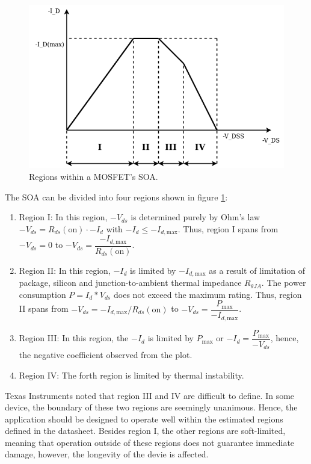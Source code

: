 \documentclass[main.tex]{subfiles}
\begin{document}
    \pagebreak
    \begin{figure}[!h]
        \centerline{\includegraphics[scale=0.5]{media/SOA_regions.drawio.png}}
        \caption{Regions within a MOSFET's SOA.}
        \label{fig:SOA_regions}
    \end{figure}

    \justify
    The SOA can be divided into four regions shown in figure \ref{fig:SOA_regions}:
    \begin{enumerate}
        \item Region I: In this region, $-V_{ds}$ is determined purely by Ohm's law  $-V_{ds} = R_{ds}(\text{on})\cdot -I_d$ with $-I_d \leq -I_{d,\text{max}}$. Thus, region I spans from $-V_{ds} = 0$ to $-V_{ds} = \dfrac{-I_{d,\text{max}}}{R_{ds}(\text{on})}$.
        \item Region II: In this region, $-I_{d}$ is limited by $-I_{d,\text{max}}$ as a result of limitation of package, silicon and junction-to-ambient thermal impedance $R_{\theta J A}$. The power consumption $P=I_{d} * V_{ds}$ does not exceed the maximum rating. Thus, region II spans from $-V_{ds} = -I_{d,\text{max}} / R_{ds}(\text{on})$ to $-V_{ds} = \dfrac{P_\text{max}}{-I_{d,\text{max}}}$.
        \item Region III: In this region, the $-I_{d}$ is limited by $P_\text{max}$ or $-I_d = \dfrac{P_\text{max}}{-V_{ds}}$, hence, the negative coefficient observed from the plot.
        \item Region IV: The forth region is limited by thermal instability. 
    \end{enumerate}

    \justify
    Texas Instruments noted that region III and IV are difficult to define. In some device, the boundary of these two regions are seemingly unanimous. Hence, the application should be designed to operate well within the estimated regions defined in the datasheet. Besides region I, the other regions are soft-limited, meaning that operation outside of these regions does not guarantee immediate damage, however, the longevity of the devie is affected.
\end{document}
